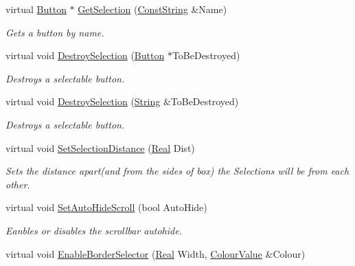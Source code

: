 \begin{DoxyCompactItemize}
virtual \hyperlink{classphys_1_1UI_1_1Button}{Button} $\ast$ \hyperlink{classphys_1_1UI_1_1ButtonListBox_a88796d75b2677b0a8e5d70fcf3677348}{GetSelection} (\hyperlink{namespacephys_a5ce5049f8b4bf88d6413c47b504ebb31}{ConstString} \&Name)
\begin{DoxyCompactList}\small\item\em Gets a button by name. \item\end{DoxyCompactList}\item 
virtual void \hyperlink{classphys_1_1UI_1_1ButtonListBox_a4ac91d2219d9fa471976bd482dc909b4}{DestroySelection} (\hyperlink{classphys_1_1UI_1_1Button}{Button} $\ast$ToBeDestroyed)
\begin{DoxyCompactList}\small\item\em Destroys a selectable button. \item\end{DoxyCompactList}\item 
virtual void \hyperlink{classphys_1_1UI_1_1ButtonListBox_a2717ab6e1ad39bb7db634a97c4f4157a}{DestroySelection} (\hyperlink{namespacephys_aa03900411993de7fbfec4789bc1d392e}{String} \&ToBeDestroyed)
\begin{DoxyCompactList}\small\item\em Destroys a selectable button. \item\end{DoxyCompactList}\item 
virtual void \hyperlink{classphys_1_1UI_1_1ButtonListBox_a85a4c25d78b8fa81ae7031ad127958bd}{SetSelectionDistance} (\hyperlink{namespacephys_af7eb897198d265b8e868f45240230d5f}{Real} Dist)
\begin{DoxyCompactList}\small\item\em Sets the distance apart(and from the sides of box) the Selections will be from each other. \item\end{DoxyCompactList}\item 
virtual void \hyperlink{classphys_1_1UI_1_1ButtonListBox_ab5caa7d6bd929875bb8ca1278743ff40}{SetAutoHideScroll} (bool AutoHide)
\begin{DoxyCompactList}\small\item\em Eanbles or disables the scrollbar autohide. \item\end{DoxyCompactList}\item 
virtual void \hyperlink{classphys_1_1UI_1_1ButtonListBox_a6369d985a45f635d0cd9e9860da407aa}{EnableBorderSelector} (\hyperlink{namespacephys_af7eb897198d265b8e868f45240230d5f}{Real} Width, \hyperlink{classphys_1_1ColourValue}{ColourValue} \&Colour)

\end{DoxyCompactItemize}

